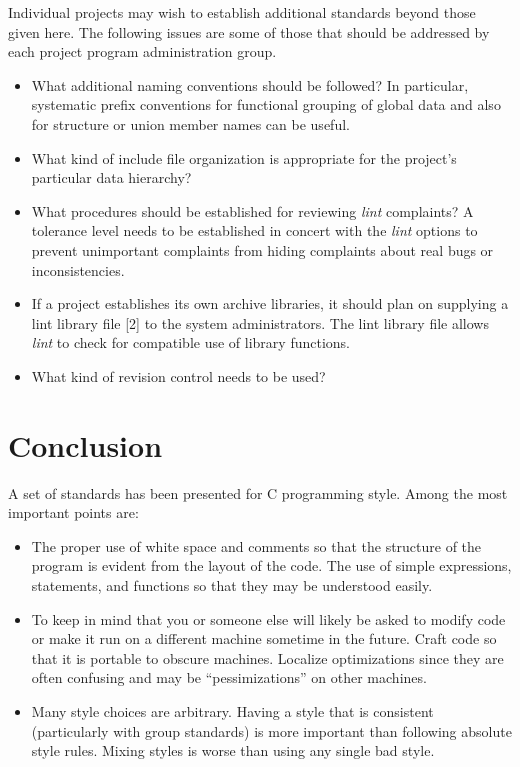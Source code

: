  Individual projects may wish to establish additional standards beyond those
given here. The following issues are some of those that should be addressed by
each project program administration group. 
\begin{itemize}
\item What additional naming conventions should be followed? In particular,
systematic prefix conventions for functional grouping of global data and also
for structure or union member names can be useful. 

\item What kind of include file organization is appropriate for the project's
particular data hierarchy? 

\item What procedures should be established for reviewing {\em lint} complaints?
A tolerance level needs to be established in concert with the {\em lint} options
to prevent unimportant complaints from hiding complaints about real bugs or
inconsistencies.

\item If a project establishes its own archive libraries, it should plan on
supplying a lint library file [2] to the system administrators. The lint
library file allows {\em lint} to check for compatible use of library
functions. 

\item What kind of revision control needs to be used? 
\end{itemize}
\newpage
\section{Conclusion}

 A set of standards has been presented for C programming style. Among the most
important points are: 
\begin{itemize}
\item The proper use of white space and comments so that the structure of the
program is evident from the layout of the code. The use of simple
expressions, statements, and functions so that they may be understood
easily. 

\item To keep in mind that you or someone else will likely be asked to modify
code or make it run on a different machine sometime in the future. Craft code
so that it is portable to obscure machines. Localize optimizations since they
are often confusing and may be ``pessimizations'' on other machines. 

\item Many style choices are arbitrary. Having a style that is consistent
(particularly with group standards) is more important than following absolute
style rules. Mixing styles is worse than using any single bad style. 

\end{itemize}

